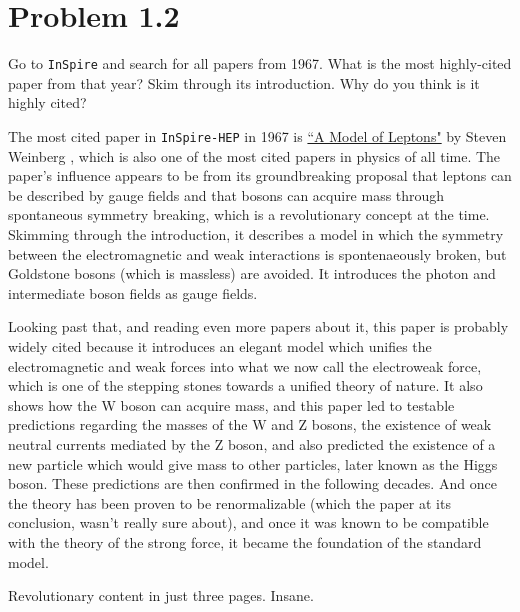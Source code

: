\documentclass[12pt,a4paper]{article}
\begin{document}
	\section*{
		Problem 1.2
	}
	\begin{problem}
		Go to \texttt{InSpire} and search for all papers from 1967. 
		What is the most highly-cited paper from that year? 
		Skim through its introduction. Why do you think is it 
		highly cited?
	\end{problem}
	\begin{solution_pset}
		The most cited paper in \texttt{InSpire-HEP} in 1967 is \href{https://journals.aps.org/prl/pdf/10.1103/PhysRevLett.19.1264}{``A Model of Leptons"} by Steven Weinberg \cite{weinberg1967leptons}, which is also 
		one of the most cited papers in physics of all time. The paper's influence appears to be from its groundbreaking proposal that leptons can 
		be described by gauge fields and that bosons can acquire mass through spontaneous symmetry breaking, which is a revolutionary concept at the time.
		Skimming through the introduction, it describes a model in which the symmetry between the electromagnetic and weak interactions is 
		spontenaeously broken, but Goldstone bosons (which is massless) are avoided. It introduces the photon and intermediate
		boson fields as gauge fields.  

		Looking past that, and reading even more papers about it, this paper is probably widely cited because it introduces an elegant model which unifies the electromagnetic
		and weak forces into what we now call the electroweak force, which is one of the stepping stones towards a unified theory 
		of nature. It also shows how the W boson can acquire mass, and this paper led to testable predictions regarding the 
		masses of the W and Z bosons, the existence of weak neutral currents mediated by the Z boson, and also predicted the 
		existence of a new particle which would give mass to other particles, later known as the Higgs boson. 
		These predictions are then confirmed in the following decades. And once the theory has been proven to be renormalizable
		(which the paper at its conclusion, wasn't really sure about), and once it was known to be compatible
		with the theory of the strong force, it became the foundation of the standard model.

		Revolutionary content in just three pages. Insane.
	\end{solution_pset}
	\newpage
\end{document}
